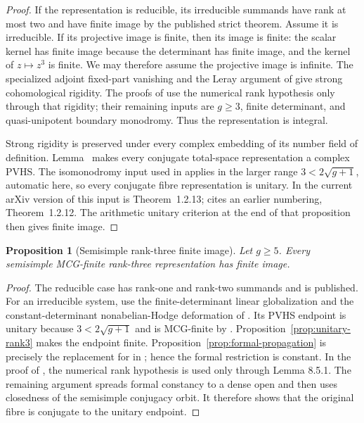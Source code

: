 \documentclass[11pt]{article}
\newtheorem{proposition}[theorem]{Proposition}
\theoremstyle{definition}
\begin{document}
\begin{proof}
If the representation is reducible, its irreducible summands have rank at
most two and have finite image by the published strict theorem.  Assume it is
irreducible.  If its projective image is finite, then its image is finite:
the scalar kernel has finite image because the determinant has finite image,
and the kernel of $z\mapsto z^3$ is finite.  We may therefore assume the
projective image is infinite.  The specialized adjoint fixed-part vanishing and the Leray
argument of \cite[Proposition 8.2.1]{LLCan} give strong cohomological
rigidity.  The proofs of \cite[Lemmas 8.3.3 and 8.3.4]{LLCan} use the
numerical rank hypothesis only through that rigidity; their remaining inputs
are $g\ge3$, finite determinant, and quasi-unipotent boundary monodromy.
Thus the representation is integral.

Strong rigidity is preserved under every complex embedding of its number
field of definition.  Lemma~\cite[Lemma 4.3.2]{LLCan} makes every conjugate
total-space representation a complex PVHS.  The isomonodromy input used in
\cite[Proposition 8.4.1]{LLCan} applies in the larger range
$3<2\sqrt{g+1}$, automatic here, so every conjugate fibre representation is
unitary.  In the current arXiv version of \cite{LLGeo} this input is
Theorem~1.2.13; \cite{LLCan} cites an earlier numbering, Theorem~1.2.12.  The arithmetic unitary criterion at the end of that proposition
then gives finite image.
\end{proof}

\begin{proposition}[Semisimple rank-three finite image]
\label{prop:semisimple-rank3}
Let $g\ge5$.  Every semisimple MCG-finite rank-three representation has
finite image.
\end{proposition}

\begin{proof}
The reducible case has rank-one and rank-two summands and is published.  For
an irreducible system, use the finite-determinant linear globalization and
the constant-determinant nonabelian-Hodge deformation of
\cite[Theorem 4.3.1]{LLCan}.  Its PVHS endpoint is unitary because
$3<2\sqrt{g+1}$ and is MCG-finite by \cite[Proposition 2.1.3]{LLCan}.
Proposition~\ref{prop:unitary-rank3} makes the endpoint finite.
Proposition~\ref{prop:formal-propagation} is precisely the replacement for
\cite[Theorem 6.2.1]{LLCan} in \cite[Lemma 8.5.1]{LLCan}; hence the formal
restriction is constant.  In the proof of \cite[Lemma 8.5.2]{LLCan}, the
numerical rank hypothesis is used only through Lemma 8.5.1.  The remaining
argument spreads formal constancy to a dense open and then uses closedness of
the semisimple conjugacy orbit.  It therefore shows that the original fibre
is conjugate to the unitary endpoint.
\end{proof}
\end{document}
